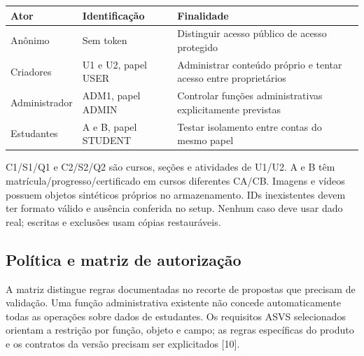 {\def\LTcaptype{none} %
\begin{longtable}[]{@{}
  >{\raggedright\arraybackslash}p{}
  >{\raggedright\arraybackslash}p{}
  >{\raggedright\arraybackslash}p{}@{}}
\toprule\noalign{}
\begin{minipage}[b]{\linewidth}\raggedright
Ator
\end{minipage} & \begin{minipage}[b]{\linewidth}\raggedright
Identificação
\end{minipage} & \begin{minipage}[b]{\linewidth}\raggedright
Finalidade
\end{minipage} \\
\midrule\noalign{}
\endhead
\bottomrule\noalign{}
\endlastfoot
Anônimo & Sem token & Distinguir acesso público de acesso protegido \\
Criadores & U1 e U2, papel USER & Administrar conteúdo próprio e tentar
acesso entre proprietários \\
Administrador & ADM1, papel ADMIN & Controlar funções administrativas
explicitamente previstas \\
Estudantes & A e B, papel STUDENT & Testar isolamento entre contas do
mesmo papel \\
\end{longtable}
}

C1/S1/Q1 e C2/S2/Q2 são cursos, seções e atividades de U1/U2. A e B têm
matrícula/\allowbreak{}progresso/\allowbreak{}certificado em cursos diferentes CA/\allowbreak{}CB. Imagens e
vídeos possuem objetos sintéticos próprios no armazenamento. IDs
inexistentes devem ter formato válido e ausência conferida no setup.
Nenhum caso deve usar dado real; escritas e exclusões usam cópias
restauráveis.

\subsection{Política e matriz de
autorização}\label{poluxedtica-e-matriz-de-autorizauxe7uxe3o}

A matriz distingue regras documentadas no recorte de propostas que
precisam de validação. Uma função administrativa existente não concede
automaticamente todas as operações sobre dados de estudantes. Os
requisitos ASVS selecionados orientam a restrição por função, objeto e
campo; as regras específicas do produto e os contratos da versão
precisam ser explicitados {[}10{]}.

